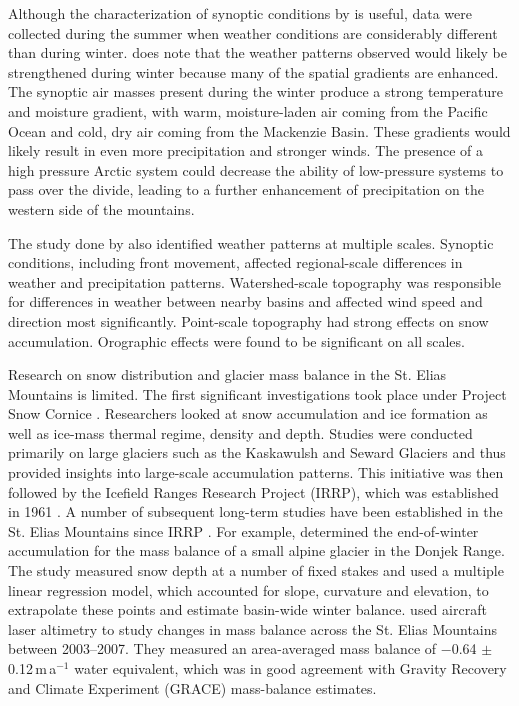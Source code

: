 \documentclass{sfuthesis}
\begin{document}
{\begin{appendices}
Although the characterization of synoptic conditions by \cite{Taylor1969} is useful, data were collected during the summer when weather conditions are considerably different than during winter. \cite{Taylor1969} does note that the weather patterns observed would likely be strengthened during winter because many of the spatial gradients are enhanced. The synoptic air masses present during the winter produce a strong temperature and moisture gradient, with warm, moisture-laden air coming from the Pacific Ocean and cold, dry air coming from the Mackenzie Basin. These gradients would likely result in even more precipitation and stronger winds. The presence of a high pressure Arctic system could decrease the ability of low-pressure systems to pass over the divide, leading to a further enhancement of precipitation on the western side of the mountains. 

The study done by \cite{Taylor1969} also identified weather patterns at multiple scales. Synoptic conditions, including front movement, affected regional-scale differences in weather and precipitation patterns. Watershed-scale topography was responsible for differences in weather between nearby basins and affected wind speed and direction most significantly. Point-scale topography had strong effects on snow accumulation. Orographic effects were found to be significant on all scales. 

Research on snow distribution and glacier mass balance in the St. Elias Mountains is limited. The first significant investigations took place under Project Snow Cornice \citep{Wood1948}. Researchers looked at snow accumulation and ice formation as well as ice-mass thermal regime, density and depth. Studies were conducted primarily on large glaciers such as the Kaskawulsh and Seward Glaciers and thus provided insights into large-scale accumulation patterns. This initiative was then followed by the Icefield Ranges Research Project (IRRP), which was established in 1961 \citep{Danby2003}. A number of subsequent long-term studies have been established in the St. Elias Mountains since IRRP \citep[e.g.][]{Clarke1984, Paoli2009}. For example, \cite{Wheler2014} determined the end-of-winter accumulation for the mass balance of a small alpine glacier in the Donjek Range. The study measured snow depth at a number of fixed stakes and used a multiple linear regression model, which accounted for slope, curvature and elevation, to extrapolate these points and estimate basin-wide winter balance. \cite{Arendt2008} used aircraft laser altimetry to study changes in mass balance across the St. Elias Mountains between 2003--2007. They measured an area-averaged mass balance of $-$0.64 $\pm$ 0.12\,m\,a$^{-1}$ water equivalent, which was in good agreement with Gravity Recovery and Climate Experiment (GRACE) mass-balance estimates.


\end{appendices}}
\end{document}
